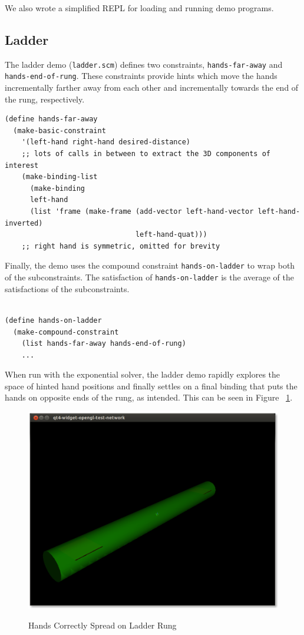 \documentclass[12pt,a4paper]{article}
\begin{document}
We also wrote a simplified REPL for loading and running demo programs.
\subsection{Ladder}
The ladder demo (\texttt{ladder.scm}) defines two constraints, \texttt{hands-far-away} and \texttt{hands-end-of-rung}. These constraints provide hints which move the hands incrementally farther away from each other and incrementally towards the end of the rung, respectively.  
\begin{lstlisting}
(define hands-far-away
  (make-basic-constraint
    '(left-hand right-hand desired-distance)
	;; lots of calls in between to extract the 3D components of interest
    (make-binding-list
      (make-binding
      left-hand
      (list 'frame (make-frame (add-vector left-hand-vector left-hand-inverted)
                               left-hand-quat)))
	;; right hand is symmetric, omitted for brevity
\end{lstlisting}

Finally, the demo uses the compound constraint \texttt{hands-on-ladder} to wrap both of the subconstraints. The satisfaction of \texttt{hands-on-ladder} is the average of the satisfactions of the subconstraints.
\begin{lstlisting}

(define hands-on-ladder
  (make-compound-constraint
    (list hands-far-away hands-end-of-rung)
	...
\end{lstlisting}

When run with the exponential solver, the ladder demo rapidly explores the space of hinted hand positions and finally settles on a final binding that puts the hands on opposite ends of the rung, as intended.  This can be seen in Figure ~\ref{fig:hands}.
\begin{figure}[H]
\caption{Hands Correctly Spread on Ladder Rung}
\centering
\includegraphics[scale=.5]{hands.png}
\label{fig:hands}
\end{figure}
\end{document}
